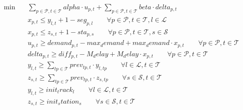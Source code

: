 \begin{align}
  \min\quad & \sum_{p \in \mathcal{P}, t \in \mathcal{T}} alpha \cdot u_{p,t} + \sum_{p \in \mathcal{P}, t \in \mathcal{T}} beta \cdot delta_{p,t} \tag{resilience_score} \\
  & x_{p,t} \le y_{l,t} + 1 - seg_{p,l} \qquad \forall p \in \mathcal{P}, t \in \mathcal{T}, l \in \mathcal{L} \tag{service_track} \\
  & x_{p,t} \le z_{s,t} + 1 - sta_{p,s} \qquad \forall p \in \mathcal{P}, t \in \mathcal{T}, s \in \mathcal{S} \tag{service_station} \\
  & u_{p,t} \ge demand_{p,t} - max_demand + max_demand \cdot x_{p,t} \qquad \forall p \in \mathcal{P}, t \in \mathcal{T} \tag{unserved_demand} \\
  & delta_{p,t} \ge diff_{p,t} - M_delay + M_delay \cdot x_{p,t} \qquad \forall p \in \mathcal{P}, t \in \mathcal{T} \tag{service_delay} \\
  & y_{l,t} \ge \sum_{tp \in \mathcal{T}} prev_{tp,t} \cdot y_{l,tp} \qquad \forall l \in \mathcal{L}, t \in \mathcal{T} \tag{track_monotonic} \\
  & z_{s,t} \ge \sum_{tp \in \mathcal{T}} prev_{tp,t} \cdot z_{s,tp} \qquad \forall s \in \mathcal{S}, t \in \mathcal{T} \tag{station_monotonic} \\
  & y_{l,t} \ge init_track_{l} \qquad \forall l \in \mathcal{L}, t \in \mathcal{T} \tag{init_track_status} \\
  & z_{s,t} \ge init_station_{s} \qquad \forall s \in \mathcal{S}, t \in \mathcal{T} \tag{init_station_status}
\end{align}